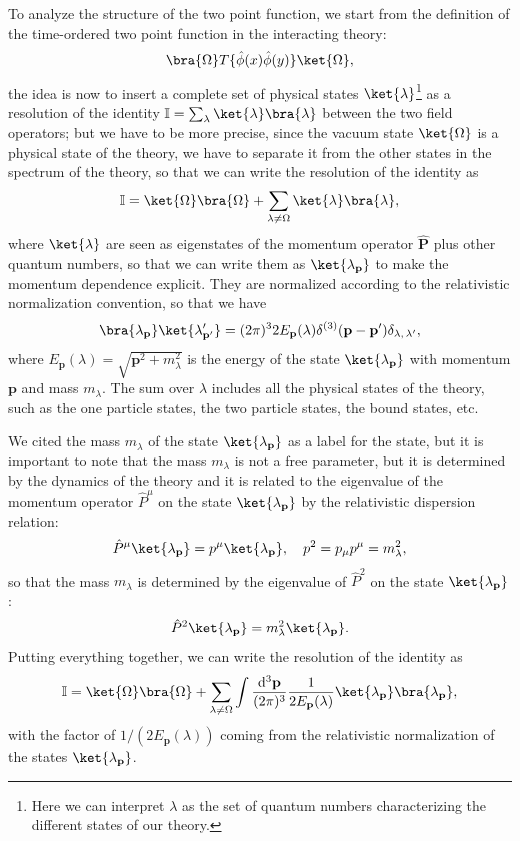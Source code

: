 To analyze the structure of the two point function, we start from the definition of the time-ordered two point function in the interacting theory:
\[
    \bra{\Omega} T \{ \hat{\phi}(x) \hat{\phi}(y) \} \ket{\Omega},
\]
the idea is now to insert a complete set of physical states \(\ket{\lambda}\)\footnote{Here we can interpret \(\lambda\) as the set of quantum numbers characterizing the different states of our theory.} as a resolution of the identity \(\mathbb{I} = \sum_{\lambda} \ket{\lambda} \bra{\lambda}\) between the two field operators; but we have to be more precise, since the vacuum state \(\ket{\Omega}\) is a physical state of the theory, we have to separate it from the other states in the spectrum of the theory, so that we can write the resolution of the identity as
\[
    \mathbb{I} = \ket{\Omega}\bra{\Omega} + \sum_{\lambda \neq \Omega} \ket{\lambda} \bra{\lambda},
\]
where $\ket{\lambda}$ are seen as eigenstates of the momentum operator \(\hat{\mathbf{P}}\) plus other quantum numbers, so that we can write them as \(\ket{\lambda_{\mathbf{p}}}\) to make the momentum dependence explicit. They are normalized according to the relativistic normalization convention, so that we have
\[
    \bra{\lambda_{\mathbf{p}}} \ket{\lambda'_{\mathbf{p}'}} = (2\pi)^3 2E_{\mathbf{p}}(\lambda) \delta^{(3)}(\mathbf{p} - \mathbf{p}') \delta_{\lambda,\,\lambda'},
\]
where \(E_{\mathbf{p}}(\lambda) = \sqrt{\mathbf{p}^2 + m_\lambda^2}\) is the energy of the state \(\ket{\lambda_{\mathbf{p}}}\) with momentum \(\mathbf{p}\) and mass \(m_\lambda\). The sum over \(\lambda\) includes all the physical states of the theory, such as the one particle states, the two particle states, the bound states, etc.

We cited the mass \(m_\lambda\) of the state \(\ket{\lambda_{\mathbf{p}}}\) as a label for the state, but it is important to note that the mass \(m_\lambda\) is not a free parameter, but it is determined by the dynamics of the theory and it is related to the eigenvalue of the momentum operator \(\hat{P}^\mu\) on the state \(\ket{\lambda_{\mathbf{p}}}\) by the relativistic dispersion relation:
\[
    \hat{P}^\mu \ket{\lambda_{\mathbf{p}}} = p^\mu \ket{\lambda_{\mathbf{p}}}, \quad p^2 = p_\mu p^\mu = m_\lambda^2,
\]
so that the mass \(m_\lambda\) is determined by the eigenvalue of \(\hat{P}^2\) on the state \(\ket{\lambda_{\mathbf{p}}}\):
\[
    \hat{P}^2 \ket{\lambda_{\mathbf{p}}} = m_\lambda^2 \ket{\lambda_{\mathbf{p}}}.
\]
Putting everything together, we can write the resolution of the identity as
\[
    \mathbb{I} = \ket{\Omega}\bra{\Omega} + \sum_{\lambda \neq \Omega} \int \frac{\mathrm{d}^3 \mathbf{p}}{(2\pi)^3} \frac{1}{2E_{\mathbf{p}}(\lambda)} \ket{\lambda_{\mathbf{p}}} \bra{\lambda_{\mathbf{p}}},
\]
with the factor of \(1/(2E_{\mathbf{p}}(\lambda))\) coming from the relativistic normalization of the states \(\ket{\lambda_{\mathbf{p}}}\).

